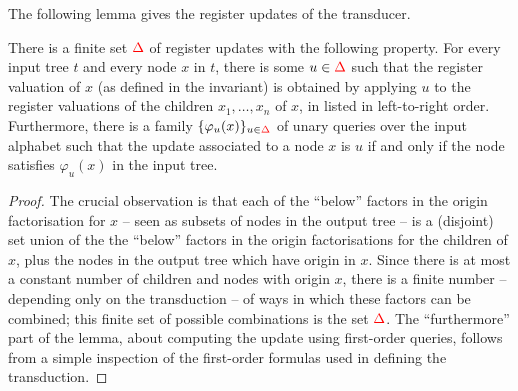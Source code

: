 The following lemma gives the  register updates of the transducer. 



\begin{lemma}\label{lem:register-updates-in-stt}
    There is a finite set ${\color{red}{\Delta}}$ of register updates with the following property. For every  input tree $t$ and every node $x$ in $t$,   there is some $u \in {\color{red}{\Delta}}$ such that the register valuation of $x$ (as defined in the invariant) is obtained by applying $u$ to the register valuations of the children $x_1,\ldots,x_n$ of $x$, in listed in left-to-right order. 
Furthermore, there is a family
$\{\varphi_u(x)\}_{u \in {\color{red}{\Delta}}}$  of unary queries over the input alphabet such that the update associated to a node $x$ is $u$ if and only if the node satisfies $\varphi_u(x)$ in the input tree. 
\end{lemma}
\begin{proof}
    The crucial observation is that each of the ``below'' factors in the origin factorisation for $x$  -- seen as subsets of nodes in the output tree -- is a (disjoint) set union of the   the ``below'' factors in the origin factorisations for the children of $x$, plus the nodes in the output tree which have origin in $x$. Since there is at most a constant number of children and nodes with origin $x$, there is a finite number -- depending only on the transduction -- of ways in which these factors can be combined; this finite set of possible combinations is the set ${\color{red}{\Delta}}$. The ``furthermore'' part of the lemma, about computing the update using first-order queries, follows from a simple inspection of the first-order formulas used in defining the  transduction. 
\end{proof}


